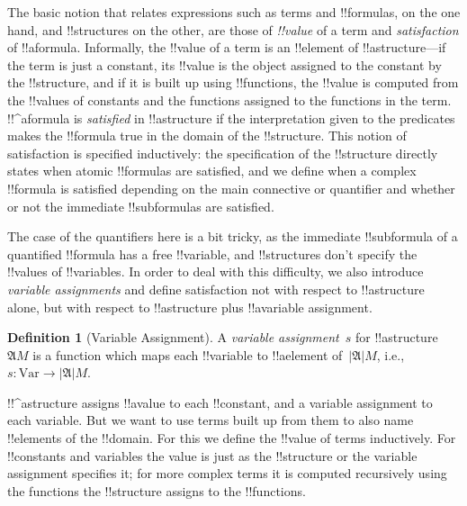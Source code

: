\documentclass[10pt,a4paper]{article}
\theoremstyle{plain}
\theoremstyle{definition}
\newtheorem{defn}[thm]{Definition}
\theoremstyle{remark}
\newenvironment{explain}{}{}
\providecommand{\Struct}{\ensuremath{\mathfrak{A}}}
\providecommand{\Domain}{\ensuremath{|\mathfrak{A}|}}
\providecommand{\Var}{\mathrm{Var}}
\begin{document}
\begin{explain}
The basic notion that relates expressions such as terms and
!!{formula}s, on the one hand, and !!{structure}s on the other, are
those of \emph{!!{value}} of a term and \emph{satisfaction} of 
!!a{formula}.  Informally, the !!{value} of a term is an !!{element} of
!!a{structure}---if the term is just a constant, its !!{value} is the
object assigned to the constant by the !!{structure}, and if it is
built up using !!{function}s, the !!{value} is computed from the
!!{value}s of constants and the functions assigned to the functions in
the term.  !!^a{formula} is \emph{satisfied} in !!a{structure} if the
interpretation given to the predicates makes the !!{formula} true in
the domain of the !!{structure}. This notion of satisfaction is
specified inductively: the specification of the !!{structure} directly
states when atomic !!{formula}s are satisfied, and we define when a
complex !!{formula} is satisfied depending on the main connective or
quantifier and whether or not the immediate !!{subformula}s are
satisfied. 

The case of the quantifiers here is a bit tricky, as the
immediate !!{subformula} of a quantified !!{formula} has a free
!!{variable}, and !!{structure}s don't specify the !!{value}s of
!!{variable}s.  In order to deal with this difficulty, we also
introduce \emph{variable assignments} and define satisfaction not with
respect to !!a{structure} alone, but with respect to !!a{structure}
plus !!a{variable} assignment.
\end{explain}

\begin{defn}[Variable Assignment]
A \emph{variable assignment}~$s$ for !!a{structure}~$\Struct{M}$ is a
function which maps each !!{variable} to !!a{element} of~$\Domain M$,
i.e., $s\colon \Var \to \Domain M$.
\end{defn}

\begin{explain}
!!^a{structure} assigns !!a{value} to each !!{constant}, and a
variable assignment to each variable.  But we want to use terms built
up from them to also name !!{element}s of the !!{domain}.  For this we
define the !!{value} of terms inductively. For !!{constant}s and
variables the value is just as the !!{structure} or the variable
assignment specifies it; for more complex terms it is computed
recursively using the functions the !!{structure} assigns to the
!!{function}s.
\end{explain}
\end{document}
